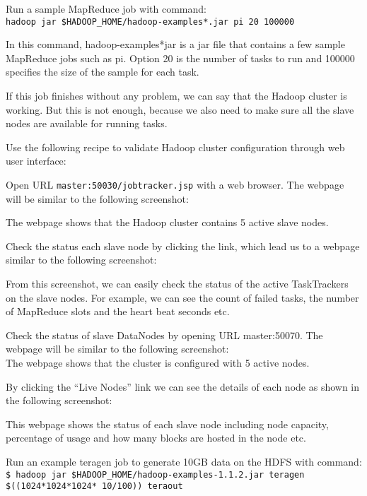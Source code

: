 Run a sample MapReduce job with command: \\
\verb|hadoop jar $HADOOP_HOME/hadoop-examples*.jar pi 20 100000|

In this command, hadoop-examples*jar is a jar file that contains a few sample MapReduce jobs such as pi. Option 20 is the number of tasks to run and 100000 specifies the size of the sample for each task.

If this job finishes without any problem, we can say that the Hadoop cluster is working. But this is not enough, because we also need to make sure all the slave nodes are available for running tasks.

Use the following recipe to validate Hadoop cluster configuration through web user interface:

Open URL \verb|master:50030/jobtracker.jsp| with a web browser.
The webpage will be similar to the following screenshot:


The webpage shows that the Hadoop cluster contains 5 active slave nodes.

Check the status each slave node by clicking the link, which lead us to a webpage similar to the following screenshot:


From this screenshot, we can easily check the status of the active TaskTrackers on the slave nodes. For example, we can see the count of failed tasks, the number of MapReduce slots and the heart beat seconds etc.

Check the status of slave DataNodes by opening URL master:50070. The webpage will be similar to the following screenshot: \\

The webpage shows that the cluster is configured with 5 active nodes.

By clicking the ``Live Nodes'' link we can see the details of each node as shown in the following screenshot:

This webpage shows the status of each slave node including node capacity, percentage of usage and how many blocks are hosted in the node etc.

Run an example teragen job to generate 10GB data on the HDFS with command:\\
\verb|$ hadoop jar $HADOOP_HOME/hadoop-examples-1.1.2.jar teragen $((1024*1024*1024* 10/100)) teraout|

